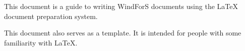 This document is a guide to writing WindForS documents using the LaTeX document preparation system.

This document also serves as a template. It is intended for people with some familiarity with LaTeX.